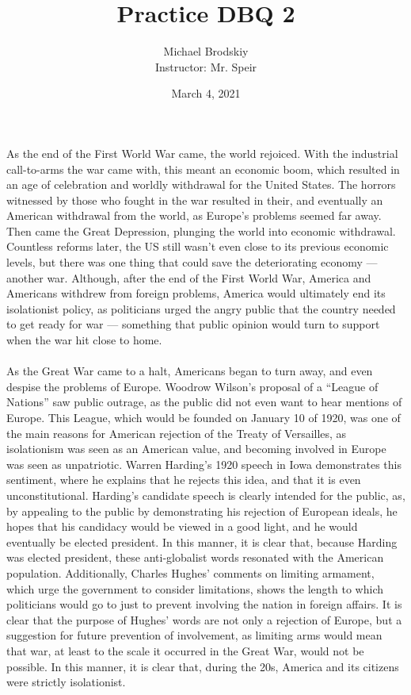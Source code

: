 \documentclass[12pt]{article}
\title{Practice DBQ 2}
\date{March 4, 2021}
\author{Michael Brodskiy\\ \small Instructor: Mr. Speir}
\begin{document}
\maketitle

\paragraph{} As the end of the First World War came, the world rejoiced. With the industrial call-to-arms the war came with, this meant an economic boom, which resulted in an age of celebration and worldly withdrawal for the United States. The horrors witnessed by those who fought in the war resulted in their, and eventually an American withdrawal from the world, as Europe's problems seemed far away. Then came the Great Depression, plunging the world into economic withdrawal. Countless reforms later, the US still wasn't even close to its previous economic levels, but there was one thing that could save the deteriorating economy — another war. Although, after the end of the First World War, America and Americans withdrew from foreign problems, America would ultimately end its isolationist policy, as politicians urged the angry public that the country needed to get ready for war — something that public opinion would turn to support when the war hit close to home. 

\paragraph{} As the Great War came to a halt, Americans began to turn away, and even despise the problems of Europe. Woodrow Wilson's proposal of a “League of Nations” saw public outrage, as the public did not even want to hear mentions of Europe. This League, which would be founded on January 10 of 1920, was one of the main reasons for American rejection of the Treaty of Versailles, as isolationism was seen as an American value, and becoming involved in Europe was seen as unpatriotic. Warren Harding's 1920 speech in Iowa demonstrates this sentiment, where he explains that he rejects this idea, and that it is even unconstitutional. Harding's candidate speech is clearly intended for the public, as, by appealing to the public by demonstrating his rejection of European ideals, he hopes that his candidacy would be viewed in a good light, and he would eventually be elected president. In this manner, it is clear that, because Harding was elected president, these anti-globalist words resonated with the American population. Additionally, Charles Hughes' comments on limiting armament, which urge the government to consider limitations, shows the length to which politicians would go to just to prevent involving the nation in foreign affairs. It is clear that the purpose of Hughes' words are not only a rejection of Europe, but a suggestion for future prevention of involvement, as limiting arms would mean that war, at least to the scale it occurred in the Great War, would not be possible. In this manner, it is clear that, during the 20s, America and its citizens were strictly isolationist.
\end{document}
